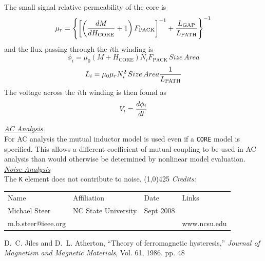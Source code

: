 \documentclass{article}
\begin{document}
The small signal relative permeability of the core is
\begin{equation}
\mu_{r} = \left\{ \left[ \left( {{\textstyle d M } \over
{\textstyle d H_{\mathrm{CORE}}}} + 1 \right) F_{\mathrm{PACK}}
\right]^{-1} + {{\textstyle L_{\mathrm{GAP}}} \over {{\textstyle
L_{\mathrm{PATH}}}}} \right\}^{-1}
\end{equation}
and the flux passing through the $i$th winding is
\begin{equation}
\phi_i = \mu_0 (M + H_{\mathrm{CORE}}) N_i F_{\mathrm{PACK}} \, Size\,
Area
\end{equation}
\begin{equation}
 L_i = \mu_0\mu_rN_i^2\,Size\,Area {{\textstyle 1} \over {\textstyle
L_{\mathrm{PATH}}}}
\end{equation}
The voltage across the $i$th winding is then found as
\begin{equation}
V_i = {{\textstyle d \phi_i} \over {\textstyle d t}}
\end{equation}

\noindent\underline{\sl \large AC Analysis}\\[0.1in]
  For AC analysis
the mutual inductor model is used even if a {\tt CORE} model is
specified.  This allows a different coefficient of mutual coupling
to be used in AC analysis than would otherwise be determined by
nonlinear model evaluation.
\\[0.2in]
\noindent\underline{\sl \large Noise Analysis}\\[0.1in]
The {\tt K} element does not contribute to noise.
\newline
\linethickness{0.5mm} \line(1,0){425}
\newline
\textit{Credits:}
\newline
\begin{tabular}{l l l l}
Name & Affiliation & Date & Links \\
Michael Steer & NC State University & Sept 2008 & \\
m.b.steer@ieee.org & & & www.ncsu.edu    \\
\end{tabular}


\begin{thebibliography}{1}
 D.~C. Jiles and D.~L. Atherton, ``Theory of ferromagnetic hysteresis,''
{\it Journal of Magnetism and Magnetic Materials}, Vol. 61, 1986. pp. 48
\end{thebibliography}
\end{document}
